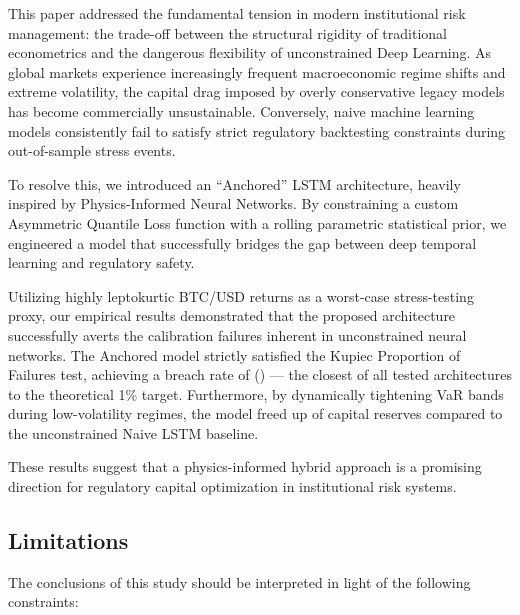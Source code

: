 
This paper addressed the fundamental tension in modern institutional risk management: the trade-off between the structural rigidity of traditional econometrics and the dangerous flexibility of unconstrained Deep Learning. As global markets experience increasingly frequent macroeconomic regime shifts and extreme volatility, the capital drag imposed by overly conservative legacy models has become commercially unsustainable. Conversely, naive machine learning models consistently fail to satisfy strict regulatory backtesting constraints during out-of-sample stress events.

To resolve this, we introduced an ``Anchored'' LSTM architecture, heavily inspired by Physics-Informed Neural Networks. By constraining a custom Asymmetric Quantile Loss function with a rolling parametric statistical prior, we engineered a model that successfully bridges the gap between deep temporal learning and regulatory safety.

Utilizing highly leptokurtic BTC/USD returns as a worst-case stress-testing proxy, our empirical results demonstrated that the proposed architecture successfully averts the calibration failures inherent in unconstrained neural networks. The Anchored model strictly satisfied the Kupiec Proportion of Failures test, achieving a breach rate of \PhysicsInformedBreachRate{} (\PhysicsInformedKupiec{}) --- the closest of all tested architectures to the theoretical 1\% target. Furthermore, by dynamically tightening VaR bands during low-volatility regimes, the model freed up \capEfficiencyBps{} of capital reserves compared to the unconstrained Naive LSTM baseline.

These results suggest that a physics-informed hybrid approach is a promising direction for regulatory capital optimization in institutional risk systems.

\subsection*{Limitations}

The conclusions of this study should be interpreted in light of the following constraints:

